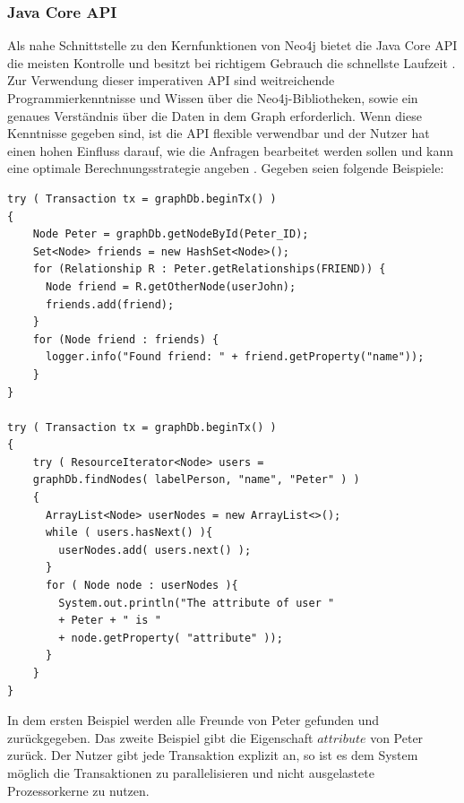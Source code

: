 \subsubsection{Java Core API}
Als nahe Schnittstelle zu den Kernfunktionen von Neo4j bietet die Java Core API die meisten Kontrolle und besitzt bei richtigem Gebrauch die schnellste Laufzeit \parencite{vukotic2015neo4j}. Zur Verwendung dieser imperativen API sind weitreichende Programmierkenntnisse und Wissen über die Neo4j-Bibliotheken, sowie ein genaues Verständnis  über die Daten in dem Graph erforderlich. Wenn diese Kenntnisse gegeben sind, ist die API flexible verwendbar  und der Nutzer hat einen hohen Einfluss darauf, wie die Anfragen bearbeitet werden sollen und kann eine optimale Berechnungsstrategie angeben \parencite{vukotic2015neo4j}. Gegeben seien folgende Beispiele: \newline
\begin{Verbatim}[frame=single]
try ( Transaction tx = graphDb.beginTx() )
{
	Node Peter = graphDb.getNodeById(Peter_ID);
	Set<Node> friends = new HashSet<Node>();
	for (Relationship R : Peter.getRelationships(FRIEND)) {  
	  Node friend = R.getOtherNode(userJohn);
	  friends.add(friend);                        
	}
	for (Node friend : friends) {
	  logger.info("Found friend: " + friend.getProperty("name")); 
	}
}

try ( Transaction tx = graphDb.beginTx() )
{
	try ( ResourceIterator<Node> users =
	graphDb.findNodes( labelPerson, "name", "Peter" ) )
	{
	  ArrayList<Node> userNodes = new ArrayList<>();
	  while ( users.hasNext() ){
		userNodes.add( users.next() );
	  }
	  for ( Node node : userNodes ){
		System.out.println("The attribute of user " 
		+ Peter + " is " 
		+ node.getProperty( "attribute" ));
	  }
	}
}
\end{Verbatim}

\noindent In dem ersten Beispiel werden alle Freunde von Peter gefunden und zurückgegeben. Das zweite Beispiel gibt die Eigenschaft $attribute$ von  Peter zurück. Der Nutzer gibt jede Transaktion explizit an, so ist es dem System möglich die Transaktionen zu parallelisieren und nicht ausgelastete Prozessorkerne zu nutzen.

